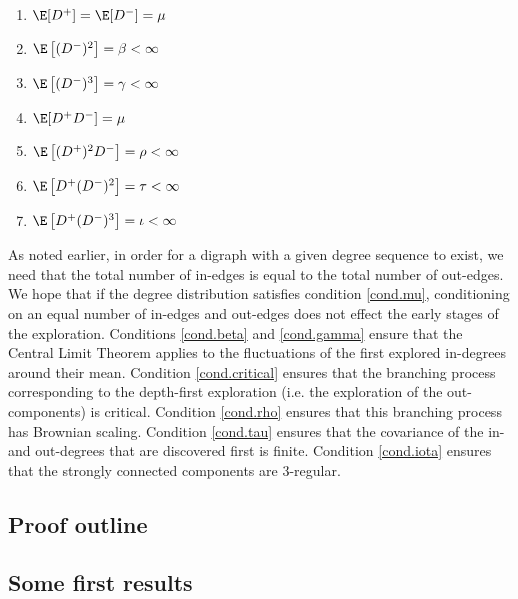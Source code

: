 \begin{enumerate}
    \item \label{cond.mu}$\E[D^+]=\E[D^-]=\mu$
    \item \label{cond.beta}$\E\left[(D^-)^2\right]=\beta<\infty$
     \item \label{cond.gamma}$\E\left[(D^-)^3\right]=\gamma<\infty$   \item \label{cond.critical} $\E[D^+ D^-]=\mu$
    \item \label{cond.rho} $\E\left[(D^+)^2 D^-\right]=\rho<\infty$
      \item \label{cond.tau} $\E\left[D^+ (D^-)^2\right]=\tau<\infty$
      \item \label{cond.iota} $\E\left[D^+(D^-)^3\right]=\iota<\infty$
\end{enumerate}
\begin{remark}
As noted earlier, in order for a digraph with a given degree sequence to exist, we need that the total number of in-edges is equal to the total number of out-edges. We hope that if the degree distribution satisfies condition \ref{cond.mu}, conditioning on an equal number of in-edges and out-edges does not effect the early stages of the exploration. 
Conditions \ref{cond.beta} and \ref{cond.gamma} ensure that the Central Limit Theorem applies to the fluctuations of the first explored in-degrees around their mean. Condition \ref{cond.critical} ensures that the branching process corresponding to the depth-first exploration (i.e. the exploration of the out-components) is critical. Condition \ref{cond.rho} ensures that this branching process has Brownian scaling. Condition \ref{cond.tau} ensures that the covariance of the in- and out-degrees that are discovered first is finite. Condition \ref{cond.iota} ensures that the strongly connected components are $3$-regular. 
\end{remark}
\subsection{Proof outline}


\subsection{Some first results}
